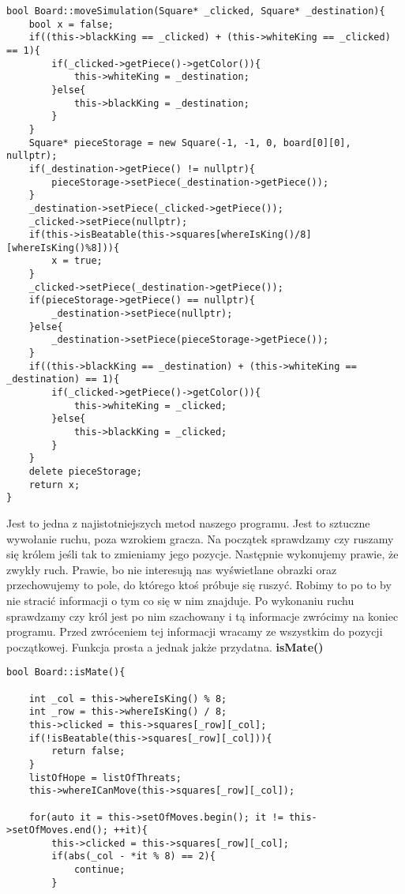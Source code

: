 \documentclass[]{report}
\begin{document}
\begin{flushleft}
\begin{lstlisting}
bool Board::moveSimulation(Square* _clicked, Square* _destination){
	bool x = false;
	if((this->blackKing == _clicked) + (this->whiteKing == _clicked) == 1){
		if(_clicked->getPiece()->getColor()){
			this->whiteKing = _destination;
		}else{
			this->blackKing = _destination;
		}
	}
	Square* pieceStorage = new Square(-1, -1, 0, board[0][0], nullptr);
	if(_destination->getPiece() != nullptr){
		pieceStorage->setPiece(_destination->getPiece());
	}
	_destination->setPiece(_clicked->getPiece());
	_clicked->setPiece(nullptr);
	if(this->isBeatable(this->squares[whereIsKing()/8][whereIsKing()%8])){
		x = true;
	}
	_clicked->setPiece(_destination->getPiece());
	if(pieceStorage->getPiece() == nullptr){
		_destination->setPiece(nullptr);
	}else{
		_destination->setPiece(pieceStorage->getPiece());
	}
	if((this->blackKing == _destination) + (this->whiteKing == _destination) == 1){
		if(_clicked->getPiece()->getColor()){
			this->whiteKing = _clicked;
		}else{
			this->blackKing = _clicked;
		}
	}
	delete pieceStorage;
	return x;
}
\end{lstlisting}
\vspace{\baselineskip}
Jest to jedna z najistotniejszych metod naszego programu. Jest to sztuczne wywołanie ruchu, poza wzrokiem gracza. Na początek sprawdzamy czy ruszamy się królem jeśli tak to zmieniamy jego pozycje. Następnie wykonujemy prawie, że zwykły ruch. Prawie, bo nie interesują nas wyświetlane obrazki oraz przechowujemy to pole, do którego ktoś próbuje się ruszyć. Robimy to po to by nie stracić informacji o tym co się w nim znajduje. Po wykonaniu ruchu sprawdzamy czy król jest po nim szachowany i tą informacje zwrócimy na koniec programu. Przed zwróceniem tej informacji wracamy ze wszystkim do pozycji początkowej. Funkcja prosta a jednak jakże przydatna.
\vspace{\baselineskip}
\newline
\newpage
\textbf{isMate()}

\begin{lstlisting}
bool Board::isMate(){
	
	int _col = this->whereIsKing() % 8;
	int _row = this->whereIsKing() / 8;
	this->clicked = this->squares[_row][_col];
	if(!isBeatable(this->squares[_row][_col])){
		return false;
	}
	listOfHope = listOfThreats;
	this->whereICanMove(this->squares[_row][_col]);
	
	for(auto it = this->setOfMoves.begin(); it != this->setOfMoves.end(); ++it){
		this->clicked = this->squares[_row][_col];
		if(abs(_col - *it % 8) == 2){
			continue;
		}
		

\end{lstlisting}
\end{flushleft}
\end{document}

